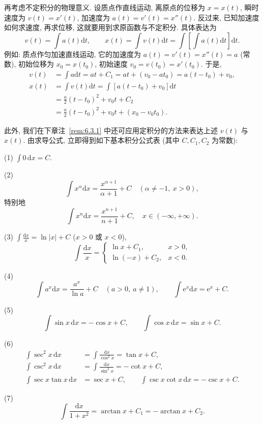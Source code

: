 再考虑不定积分的物理意义. 设质点作直线运动, 离原点的位移为 $x=x(t)$, 瞬时速度为 $v(t)=x'(t)$, 加速度为 $a(t)=v'(t)=x''(t)$. 反过来, 已知加速度如何求速度, 再求位移, 这就要用到求原函数与不定积分. 具体表达为
\[
v(t)=\int a(t)\mathrm{d}t,\qquad
x(t)=\int v(t)\mathrm{d}t=\int\left[\int a(t)\mathrm{d}t\right]\mathrm{d}t.
\]
例如: 质点作匀加速直线运动, 它的加速度为 $a(t)=v'(t)=x''(t)=a$ (常数), 初始位移为 $x_{0}=x(t_{0})$, 初始速度 $v_{0}=v(t_{0})=x'(t_{0})$. 于是,
\begin{align*}
v(t)&=\int a\mathrm{d}t=at+C_{1}=at+(v_{0}-at_{0})=a(t-t_{0})+v_{0},\\
x(t)&=\int v(t)\mathrm{d}t=\int\left[a(t-t_{0})+v_{0}\right]\mathrm{d}t\\
&=\frac{a}{2}(t-t_{0})^{2}+v_{0}t+C_{2}\\
&=\frac{a}{2}(t-t_{0})^{2}+v_{0}t+(x_{0}-v_{0}t_{0}).
\end{align*}

此外, 我们在下章注~\ref{rem:6.3.1} 中还可应用定积分的方法来表达上述 $v(t)$ 与 $x(t)$. 由求导公式, 立即得到如下基本积分公式表 (其中 $C,C_{1},C_{2}$ 为常数):

(1) $\int 0\,\mathrm{d}x=C$.

(2)
\[
\int x^{\alpha}\mathrm{d}x=\frac{x^{\alpha+1}}{\alpha+1}+C\quad (\alpha\neq -1,\ x>0),
\]
特别地
\[
\int x^{n}\mathrm{d}x=\frac{x^{n+1}}{n+1}+C,\quad x\in(-\infty,+\infty).
\]

(3) $\int\frac{\mathrm{d}x}{x}=\ln|x|+C$ ($x>0$ 或 $x<0$),
\[
\int\frac{\mathrm{d}x}{x}=
\begin{cases}
\ln x+C_{1}, & x>0,\\
\ln(-x)+C_{2}, & x<0.
\end{cases}
\]

(4)
\[
\int a^{x}\mathrm{d}x=\frac{a^{x}}{\ln a}+C\quad (a>0,\ a\neq 1),\qquad
\int\mathrm{e}^{x}\mathrm{d}x=\mathrm{e}^{x}+C.
\]

(5)
\[
\int\sin x\,\mathrm{d}x=-\cos x+C,\qquad
\int\cos x\,\mathrm{d}x=\sin x+C.
\]

(6)
\begin{align*}
\int\sec^{2}x\,\mathrm{d}x&=\int\frac{\mathrm{d}x}{\cos^{2}x}=\tan x+C,\\
\int\csc^{2}x\,\mathrm{d}x&=\int\frac{\mathrm{d}x}{\sin^{2}x}=-\cot x+C,\\
\int\sec x\tan x\,\mathrm{d}x&=\sec x+C,\qquad
\int\csc x\cot x\,\mathrm{d}x=-\csc x+C.
\end{align*}

(7)
\[
\int\frac{\mathrm{d}x}{1+x^{2}}=\arctan x+C_{1}=-\arctan x+C_{2}.
\]

